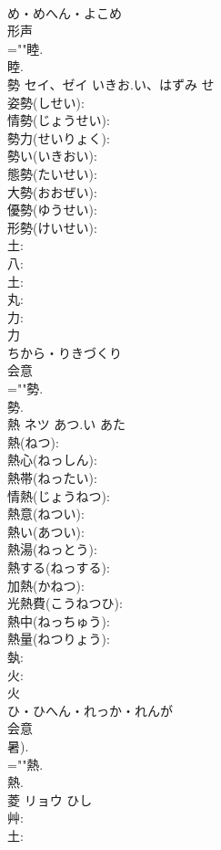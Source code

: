 \documentclass[8pt]{extreport}
\begin{document}
\begin{CJK}{UTF8}{min}
\\	め・めへん・よこめ	
\\	形声 
\\	=""睦.
\\	睦.
\\	勢	セイ、ゼイ	いきお.い、はずみ	せ	
\\	姿勢(しせい): 
\\	情勢(じょうせい): 
\\	勢力(せいりょく): 
\\	勢い(いきおい): 
\\	態勢(たいせい): 
\\	大勢(おおぜい): 
\\	優勢(ゆうせい): 
\\	形勢(けいせい): 
\\	土: 
\\	八: 
\\	土: 
\\	丸: 
\\	力: 
\\	力	
\\	ちから・りきづくり	
\\	会意 
\\	=""勢.
\\	勢.
\\	熱	ネツ	あつ.い	あた	
\\	熱(ねつ): 
\\	熱心(ねっしん): 
\\	熱帯(ねったい): 
\\	情熱(じょうねつ): 
\\	熱意(ねつい): 
\\	熱い(あつい): 
\\	熱湯(ねっとう): 
\\	熱する(ねっする): 
\\	加熱(かねつ): 
\\	光熱費(こうねつひ): 
\\	熱中(ねっちゅう): 
\\	熱量(ねつりょう): 
\\	埶: 
\\	火: 
\\	火	
\\	ひ・ひへん・れっか・れんが	
\\	会意 
\\	暑). 
\\	=""熱.
\\	熱.
\\	菱	リョウ	ひし		
\\	艸: 
\\	土: 

\end{CJK}
\end{document}
